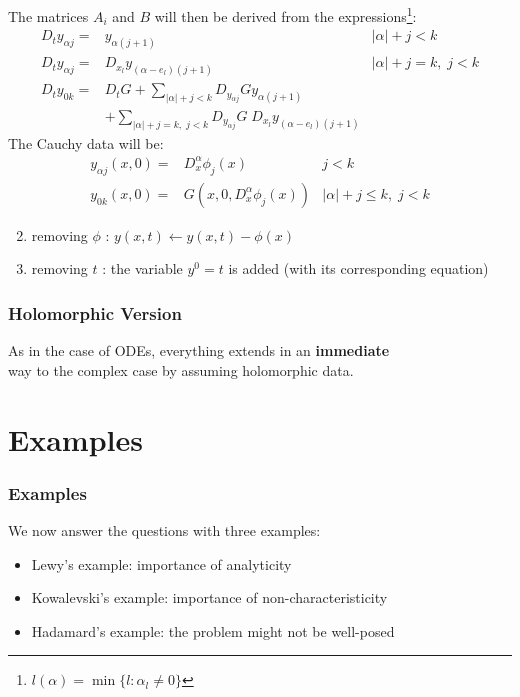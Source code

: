 \documentclass[serif,notheorems]{beamer}
\theoremstyle{definition} %
\theoremstyle{remark}
\begin{document}
\begin{frame}
The matrices $A_i$ and $B$ will then be derived from the expressions\footnote{$l(\alpha)=\min\{ l:\alpha_l\neq 0 \} $}:
\begin{align*}
D_t y_{\alpha j} =& y_{\alpha (j+1)} & |\alpha| + j < k \\
D_t y_{\alpha j} =& D_{x_l} y_{(\alpha-e_l)(j+1)} & |\alpha| + j = k, \; j < k\\
D_t y_{0k} =& D_tG + \sum_{|\alpha|+j < k} D_{y_{\alpha j}}G y_{\alpha (j+1)} \\
& + \sum_{|\alpha|+j = k, \; j < k} D_{y_{\alpha j}} G \; D_{x_l} y_{(\alpha-e_l)(j+1)}
\end{align*}
The Cauchy data will be:
\begin{align*}
y_{\alpha j}(x, 0) = & D_x^{\alpha} \phi_j(x) & j < k\\
y_{0k}(x, 0) = & G\left( x, 0, D_x^{\alpha} \phi_j(x) \right) & \lvert \alpha \rvert + j \leq k, \; j < k
\end{align*}
\end{frame}

\begin{frame}
\begin{enumerate}
\setcounter{enumi}{1}
\item removing $\phi$ : $y(x,t)\leftarrow y(x,t)-\phi (x)$
\item removing $t$ : the variable $y^0=t$ is added (with its corresponding equation)
\end{enumerate}
\end{frame}

\begin{frame}
\frametitle{Holomorphic Version}
\begin{center}
As in the case of ODEs, everything extends in an \textbf{immediate}\\
way to the complex case by assuming holomorphic data.
\end{center}
\end{frame}

\section{Examples}

\begin{frame}
\frametitle{Examples}
We now answer the questions with three examples:
\begin{itemize}
\item Lewy's example: importance of analyticity
\item Kowalevski's example: importance of non-characteristicity
\item Hadamard's example: the problem might not be well-posed
\end{itemize}
\end{frame}
\end{document}
